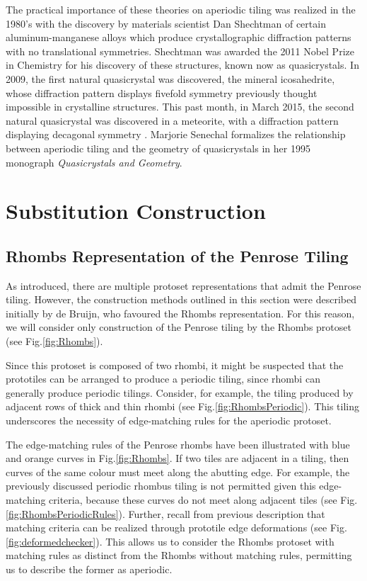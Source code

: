 \documentclass[
  oneside,
  11pt, a4paper,
  footinclude=true,
  headinclude=true,
  cleardoublepage=empty
]{scrbook}
\begin{document}
The practical importance of these theories on aperiodic tiling was realized in the 1980's with the discovery by materials scientist Dan Shechtman of certain aluminum-manganese alloys which produce crystallographic diffraction patterns with no translational symmetries. Shechtman was awarded the 2011 Nobel Prize in Chemistry for his discovery of these structures, known now as quasicrystals. In 2009, the first natural quasicrystal was discovered, the mineral icosahedrite, whose diffraction pattern displays fivefold symmetry previously thought impossible in crystalline structures. This past month, in March 2015, the second natural quasicrystal was discovered in a meteorite, with a diffraction pattern displaying decagonal symmetry \cite{Bindi2015}. Marjorie Senechal formalizes the relationship between aperiodic tiling and the geometry of quasicrystals in her 1995 monograph \textit{Quasicrystals and Geometry}. 


\chapter{Substitution Construction}

\section{Rhombs Representation of the Penrose Tiling} %
As introduced, there are multiple protoset representations that admit the Penrose tiling. However, the construction methods outlined in this section were described initially by de Bruijn, who favoured the Rhombs representation.  For this reason, we will consider only construction of the Penrose tiling by the Rhombs protoset (see Fig.\ref{fig:Rhombs}). 

Since this protoset is composed of two rhombi, it might be suspected that the prototiles can be arranged to produce a periodic tiling, since rhombi can generally produce periodic tilings. Consider, for example, the tiling produced by adjacent rows of thick and thin rhombi (see Fig.\ref{fig:RhombsPeriodic}). This tiling underscores the necessity of edge-matching rules for the aperiodic protoset. 

The edge-matching rules of the Penrose rhombs have been illustrated with blue and orange curves in Fig.\ref{fig:Rhombs}. If two tiles are adjacent in a tiling, then curves of the same colour must meet along the abutting edge. For example, the previously discussed periodic rhombus tiling is not permitted given this edge-matching criteria, because these curves do not meet along adjacent tiles (see Fig.\ref{fig:RhombsPeriodicRules}). Further, recall from previous description that matching criteria can be realized through prototile edge deformations (see Fig.\ref{fig:deformedchecker}). This allows us to consider the Rhombs protoset with matching rules as distinct from the Rhombs without matching rules, permitting us to describe the former as aperiodic. 
\end{document}
